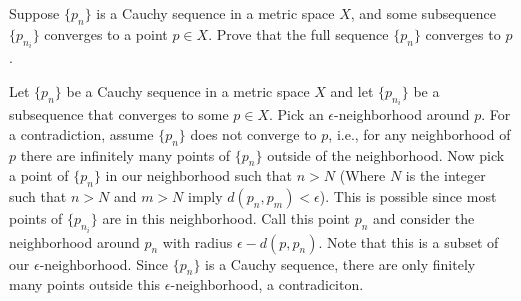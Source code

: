 \setcounter{problem}{19}
\begin{problem}
  Suppose $\{p_n\}$ is a Cauchy sequence in a metric space $X$, and some subsequence $\{p_{n_i}\}$ converges to a point $p \in X$.
  Prove that the full sequence $\{p_n\}$ converges to $p$.
\end{problem}

\begin{solution}
  Let $\{p_n\}$ be a Cauchy sequence in a metric space $X$ and let $\{p_{n_i}\}$ be a subsequence that converges to some $p \in X$.
  Pick an $\epsilon$-neighborhood around $p$.
  For a contradiction, assume $\{p_n\}$ does not converge to $p$, i.e., for any neighborhood of $p$ there are infinitely many points of $\{p_n\}$ outside of the neighborhood.
  Now pick a point of $\{p_{n}\}$ in our neighborhood such that $n > N$ (Where $N$ is the integer such that $n > N$ and $m > N$ imply $d(p_n, p_m) < \epsilon$).
  This is possible since most points of $\{p_{n_i}\}$ are in this neighborhood.
  Call this point $p_n$ and consider the neighborhood around $p_n$ with radius $\epsilon - d(p, p_n)$.
  Note that this is a subset of our $\epsilon$-neighborhood.
  Since $\{p_n\}$ is a Cauchy sequence, there are only finitely many points outside this $\epsilon$-neighborhood, a contradiciton.
\end{solution}
